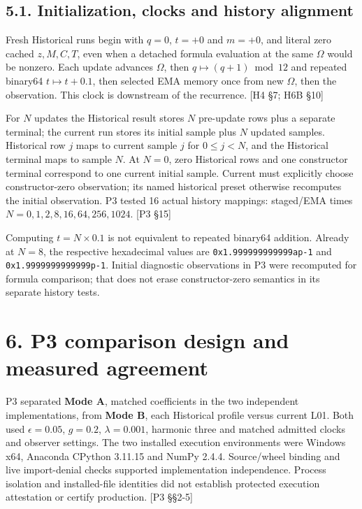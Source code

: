 \documentclass[
  11pt,
  a4paper,
]{article}
\begin{document}
\subsection{5.1. Initialization, clocks and history alignment}\label{initialization-clocks-and-history-alignment}

Fresh Historical runs begin with \(q=0\), \(t=+0\) and \(m=+0\), and literal zero cached \(z,M,C,T\), even when a detached formula evaluation at the same \(\Omega\) would be nonzero. Each update advances \(\Omega\), then \(q\mapsto(q+1)\bmod12\) and repeated binary64 \(t\mapsto t+0.1\), then selected EMA memory once from new \(\Omega\), then the observation. This clock is downstream of the recurrence. {[}H4 §7; H6B §10{]}

For \(N\) updates the Historical result stores \(N\) pre-update rows plus a separate terminal; the current run stores its initial sample plus \(N\) updated samples. Historical row \(j\) maps to current sample \(j\) for \(0\le j<N\), and the Historical terminal maps to sample \(N\). At \(N=0\), zero Historical rows and one constructor terminal correspond to one current initial sample. Current must explicitly choose constructor-zero observation; its named historical preset otherwise recomputes the initial observation. P3 tested 16 actual history mappings: staged/EMA times \(N=0,1,2,8,16,64,256,1024\). {[}P3 §15{]}

Computing \(t=N\times0.1\) is not equivalent to repeated binary64 addition. Already at \(N=8\), the respective hexadecimal values are \nolinkurl{0x1.999999999999ap-1} and \nolinkurl{0x1.9999999999999p-1}. Initial diagnostic observations in P3 were recomputed for formula comparison; that does not erase constructor-zero semantics in its separate history tests.

\section{6. P3 comparison design and measured agreement}\label{p3-comparison-design-and-measured-agreement}

P3 separated \textbf{Mode A}, matched coefficients in the two independent implementations, from \textbf{Mode B}, each Historical profile versus current L01. Both used \(\epsilon=0.05\), \(g=0.2\), \(\lambda=0.001\), harmonic three and matched admitted clocks and observer settings. The two installed execution environments were Windows x64, Anaconda CPython 3.11.15 and NumPy 2.4.4. Source/wheel binding and live import-denial checks supported implementation independence. Process isolation and installed-file identities did not establish protected execution attestation or certify production. {[}P3 §§2-5{]}
\end{document}
